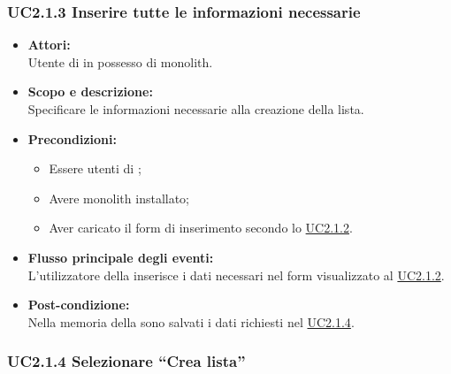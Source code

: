 \subsubsection{UC2.1.3 Inserire tutte le informazioni necessarie} \label{UC2.1.3}

\begin{itemize}
	\item \textbf{Attori:}
	\\Utente di  in possesso di monolith.
	\item \textbf{Scopo e descrizione:} 
	\\Specificare le informazioni necessarie alla creazione della lista.
	\item \textbf{Precondizioni:}
	\begin{itemize}
		\item Essere utenti di ;
		\item Avere monolith installato;
		\item Aver caricato il form di inserimento secondo lo \hyperref[UC2.1.2]{UC2.1.2}.
	\end{itemize}
	\item \textbf{Flusso principale degli eventi:}
	\\L'utilizzatore della  inserisce i dati necessari nel form visualizzato al  \hyperref[UC2.1.2]{UC2.1.2}.
	\item \textbf{Post-condizione:}
	\\Nella memoria della  sono salvati i dati richiesti nel  \hyperref[UC2.1.4]{UC2.1.4}. 
\end{itemize}

\subsubsection{UC2.1.4 Selezionare “Crea lista”} \label{UC2.1.4}

